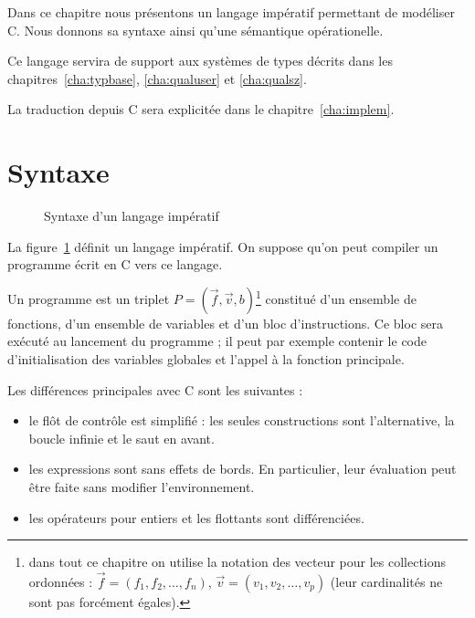 Dans ce chapitre nous présentons un langage impératif permettant de modéliser C.
Nous donnons sa syntaxe ainsi qu'une sémantique opérationelle.

Ce langage servira de support aux systèmes de types décrits dans les
chapitres~\ref{cha:typbase}, \ref{cha:qualuser} et \ref{cha:qualsz}.

La traduction depuis C sera explicitée dans le chapitre~\ref{cha:implem}.

\section{Syntaxe}

\begin{figure}

\caption{Syntaxe d'un langage impératif}
\label{fig:syntx}
\end{figure}



La figure~\ref{fig:syntx} définit un langage impératif. On suppose qu'on peut
compiler un programme écrit en C vers ce langage.

Un programme est un triplet $P = (\vec{f}, \vec{v}, b)$\footnote{ dans tout ce
chapitre on utilise la notation des vecteur pour les collections ordonnées :
$\vec{f} = (f_1, f_2, …, f_n)$, $\vec{v} = (v_1, v_2, …, v_p)$ (leur
cardinalités ne sont pas forcément égales).} constitué d'un ensemble de
fonctions, d'un ensemble de variables et d'un bloc d'instructions. Ce bloc sera
exécuté au lancement du programme ; il peut par exemple contenir le code
d'initialisation des variables globales et l'appel à la fonction principale.


Les différences principales avec C sont les suivantes :

\begin{itemize}
\item
  le flôt de contrôle est simplifié : les seules constructions sont
  l'alternative, la boucle infinie et le saut en avant.
\item
  les expressions sont sans effets de bords. En particulier, leur
  évaluation peut être faite sans modifier l'environnement.
\item
  les opérateurs pour entiers et les flottants sont différenciées.
\end{itemize}

